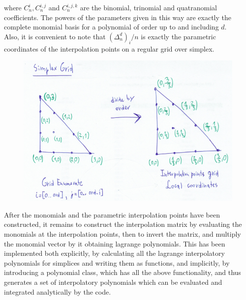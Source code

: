 \noindent
where $C^{i}_n, C^{i,j}_n$ and $C^{i,j,k}_n$ are the binomial, trinomial and quatranomial coefficients. The powers of the parameters given in this way are exactly the complete monomial basis for a polynomial of order up to and including $d$. \\

\noindent
Also, it is convenient to note that $(\Delta^{d}_n)_i / n$ is exactly the parametric coordinates of the interpolation points on a regular grid over simplex. 

\begin{figure}[hp]
    \centering
    \includegraphics[scale=0.5]{doc-pics/pic-simplex-grid.png}
\end{figure}

\noindent
After the monomials and the parametric interpolation points have been constructed, it remains to construct the interpolation matrix by evaluating the monomials at the interpolation points, then to invert the matrix, and multiply the monomial vector by it obtaining lagrange polynomials. This has been implemented both explicitly, by calculating all the lagrange interpolatory polynomials for simplices and writing them as functions, and implicitly, by introducing a polynomial class, which has all the above functionality, and thus generates a set of interpolatory polynomials which can be evaluated and integrated analytically by the code.